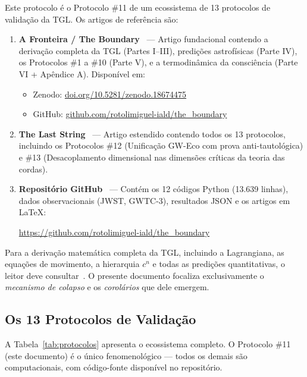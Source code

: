 \documentclass[12pt, a4paper]{article}
\theoremstyle{tglstyle}
\theoremstyle{definition}
\begin{document}
Este protocolo é o Protocolo \#11 de um ecossistema de 13 protocolos de validação da TGL. Os artigos de referência são:

\begin{enumerate}[label=(\alph*)]
    \item \textbf{A Fronteira / The Boundary}~\cite{Miguel2026Fronteira} --- Artigo fundacional contendo a derivação completa da TGL (Partes I--III), predições astrofísicas (Parte IV), os Protocolos \#1 a \#10 (Parte V), e a termodinâmica da consciência (Parte VI + Apêndice A). Disponível em:
    \begin{itemize}[nosep]
        \item Zenodo: \href{https://doi.org/10.5281/zenodo.18674475}{doi.org/10.5281/zenodo.18674475}
        \item GitHub: \href{https://github.com/rotolimiguel-iald/the\_boundary}{github.com/rotolimiguel-iald/the\_boundary}
    \end{itemize}
    
    \item \textbf{The Last String}~\cite{Miguel2026LastString} --- Artigo estendido contendo todos os 13 protocolos, incluindo os Protocolos \#12 (Unificação GW-Eco com prova anti-tautológica) e \#13 (Desacoplamento dimensional nas dimensões críticas da teoria das cordas).
    
    \item \textbf{Repositório GitHub}~\cite{Miguel2026GitHub} --- Contém os 12 códigos Python (13.639 linhas), dados observacionais (JWST, GWTC-3), resultados JSON e os artigos em \LaTeX:
    \begin{center}
        \url{https://github.com/rotolimiguel-iald/the_boundary}
    \end{center}
\end{enumerate}

Para a derivação matemática completa da TGL, incluindo a Lagrangiana, as equações de movimento, a hierarquia $c^n$ e todas as predições quantitativas, o leitor deve consultar~\cite{Miguel2026Fronteira}. O presente documento focaliza exclusivamente o \textit{mecanismo de colapso} e os \textit{corolários} que dele emergem.

\subsection{Os 13 Protocolos de Validação}\label{sec:protocolos}

A Tabela~\ref{tab:protocolos} apresenta o ecossistema completo. O Protocolo \#11 (este documento) é o único fenomenológico --- todos os demais são computacionais, com código-fonte disponível no repositório.
\end{document}

